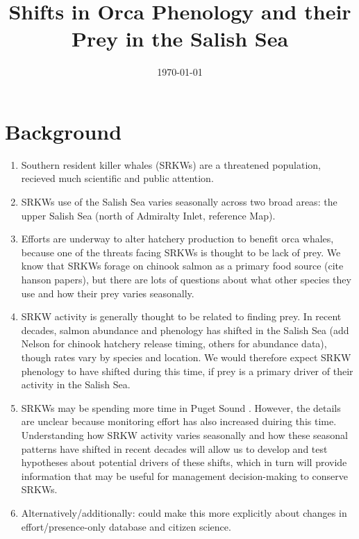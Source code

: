 \documentclass{article}
\begin{document}



\title{Shifts in Orca Phenology and their Prey in the Salish Sea}
\date{\today}
\maketitle

\section* {Background}
\begin{enumerate}
\item Southern resident killer whales (SRKWs) are a threatened population, recieved much scientific and public attention.
\item  SRKWs use of the Salish Sea varies seasonally across two broad areas: the upper Salish Sea 
(north of Admiralty Inlet, reference Map).
\item Efforts are underway to alter hatchery production to benefit orca whales, because one of the threats facing SRKWs is thought to be lack of prey. We know that SRKWs forage on chinook salmon as a primary food source (cite hanson papers), but there are lots of questions about what other species they use and how their prey varies seasonally. 
\item SRKW activity is generally thought to be related to finding prey. In recent decades, salmon abundance and phenology has shifted in the Salish Sea \citep{weinheimer2017,reed2011,ford2006}(add Nelson for chinook hatchery release timing, others for abundance data), though rates vary by species and location. We would therefore expect SRKW phenology to have shifted during this time, if prey is a primary driver of their activity in the Salish Sea. 

\item SRKWs may be spending more time in Puget Sound \citep{olson2018}. However, the details are unclear because monitoring effort has also increased duiring this time. Understanding how SRKW activity varies seasonally and how these seasonal patterns have shifted in recent decades will allow us to develop and test hypotheses about potential drivers of these shifts, which in turn will provide information that may be useful for management decision-making to conserve SRKWs.
\item Alternatively/additionally: could make this more explicitly about changes in effort/presence-only database and citizen science. 
\end{enumerate}
\end{document}
